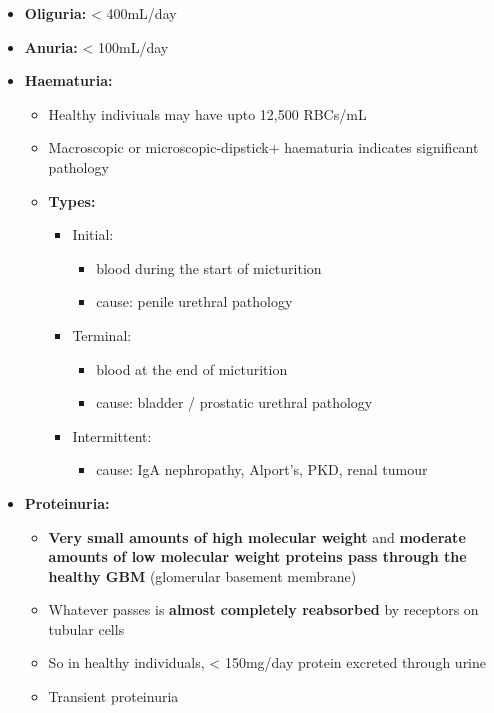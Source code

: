 \documentclass[
  12pt,
]{memoir}
\providecommand{\tightlist}{%
  \setlength{\itemsep}{0pt}\setlength{\parskip}{0pt}}
\begin{document}
\begin{itemize}
\tightlist
\item
  \textbf{Oliguria:} \textless{} 400mL/day
\item
  \textbf{Anuria:} \textless{} 100mL/day
\item
  \textbf{Haematuria:}

  \begin{itemize}
  \tightlist
  \item
    Healthy indiviuals may have upto 12,500 RBCs/mL
  \item
    Macroscopic or microscopic-dipstick+ haematuria indicates
    significant pathology
  \item
    \textbf{Types:}

    \begin{itemize}
    \tightlist
    \item
      Initial:

      \begin{itemize}
      \tightlist
      \item
        blood during the start of micturition
      \item
        cause: penile urethral pathology
      \end{itemize}
    \item
      Terminal:

      \begin{itemize}
      \tightlist
      \item
        blood at the end of micturition
      \item
        cause: bladder / prostatic urethral pathology
      \end{itemize}
    \item
      Intermittent:

      \begin{itemize}
      \tightlist
      \item
        cause: IgA nephropathy, Alport's, PKD, renal tumour
      \end{itemize}
    \end{itemize}
  \end{itemize}
\item
  \textbf{Proteinuria:}

  \begin{itemize}
  \tightlist
  \item
    \textbf{Very small amounts of high molecular weight} and
    \textbf{moderate amounts of low molecular weight proteins pass
    through the healthy GBM} (glomerular basement membrane)
  \item
    Whatever passes is \textbf{almost completely reabsorbed} by
    receptors on tubular cells
  \item
    So in healthy individuals, \textless{} 150mg/day protein excreted
    through urine
  \item
    Transient proteinuria


\end{itemize}
\end{itemize}
\end{document}
